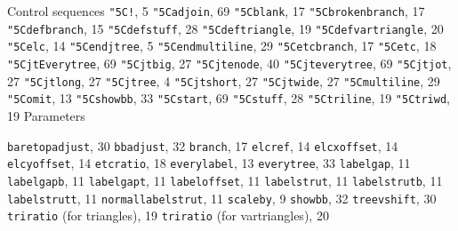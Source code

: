 \def\\{\char"5C}
Control sequences\smallskip
{\tt \\!}, 5
{\tt \\adjoin}, 69
{\tt \\blank}, 17
{\tt \\brokenbranch}, 17
{\tt \\defbranch}, 15
{\tt \\defstuff}, 28
{\tt \\deftriangle}, 19
{\tt \\defvartriangle}, 20
{\tt \\elc}, 14
{\tt \\endjtree}, 5
{\tt \\endmultiline}, 29
{\tt \\etcbranch}, 17
{\tt \\etc}, 18
{\tt \\jtEverytree}, 69
{\tt \\jtbig}, 27
{\tt \\jtenode}, 40
{\tt \\jteverytree}, 69
{\tt \\jtjot}, 27
{\tt \\jtlong}, 27
{\tt \\jtree}, 4
{\tt \\jtshort}, 27
{\tt \\jtwide}, 27
{\tt \\multiline}, 29
{\tt \\omit}, 13
{\tt \\showbb}, 33
{\tt \\start}, 69
{\tt \\stuff}, 28
{\tt \\triline}, 19
{\tt \\triwd}, 19
\medskip Parameters\smallskip

{\tt baretopadjust}, 30
{\tt bbadjust}, 32
{\tt branch}, 17
{\tt elcref}, 14
{\tt elcxoffset}, 14
{\tt elcyoffset}, 14
{\tt etcratio}, 18
{\tt everylabel}, 13
{\tt everytree}, 33
{\tt labelgap}, 11
{\tt labelgapb}, 11
{\tt labelgapt}, 11
{\tt labeloffset}, 11
{\tt labelstrut}, 11
{\tt labelstrutb}, 11
{\tt labelstrutt}, 11
{\tt normallabelstrut}, 11
{\tt scaleby}, 9
{\tt showbb}, 32
{\tt treevshift}, 30
{\tt triratio} (for triangles), 19
{\tt triratio} (for vartriangles), 20
